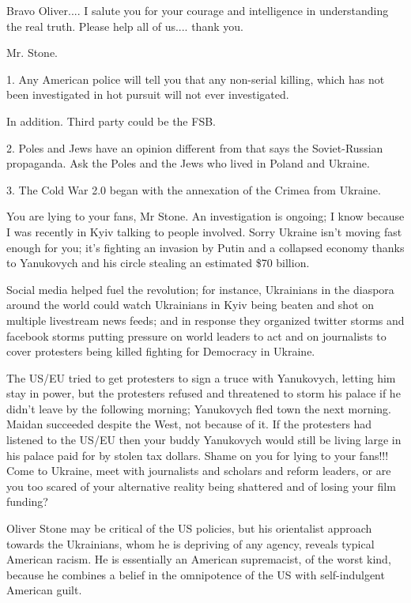 \begin{itemize} %

Bravo Oliver.... I salute you for your courage and intelligence in understanding
the real truth. Please help all of us.... thank you.

Mr. Stone.

1. Any American police will tell you that any non-serial killing, which has not
been investigated in hot pursuit will not ever investigated.

In addition. Third party could be the FSB.

2. Poles and Jews have an opinion different from that says the Soviet-Russian
propaganda. Ask the Poles and the Jews who lived in Poland and Ukraine.

3. The Cold War 2.0 began with the annexation of the Crimea from Ukraine.


You are lying to your fans, Mr Stone. An investigation is ongoing; I know
because I was recently in Kyiv talking to people involved. Sorry Ukraine isn't
moving fast enough for you; it's fighting an invasion by Putin and a collapsed
economy thanks to Yanukovych and his circle stealing an estimated \$70 billion.

Social media helped fuel the revolution; for instance, Ukrainians in the
diaspora around the world could watch Ukrainians in Kyiv being beaten and shot
on multiple livestream news feeds; and in response they organized twitter
storms and facebook storms putting pressure on world leaders to act and on
journalists to cover protesters being killed fighting for Democracy in Ukraine.

The US/EU tried to get protesters to sign a truce with Yanukovych, letting him
stay in power, but the protesters refused and threatened to storm his palace if
he didn't leave by the following morning; Yanukovych fled town the next
morning. Maidan succeeded despite the West, not because of it. If the
protesters had listened to the US/EU then your buddy Yanukovych would still be
living large in his palace paid for by stolen tax dollars. Shame on you for
lying to your fans!!! Come to Ukraine, meet with journalists and scholars and
reform leaders, or are you too scared of your alternative reality being
shattered and of losing your film funding?


Oliver Stone may be critical of the US policies, but his orientalist approach
towards the Ukrainians, whom he is depriving of any agency, reveals typical
American racism. He is essentially an American supremacist, of the worst kind,
because he combines a belief in the omnipotence of the US with self-indulgent
American guilt.


\end{itemize}
